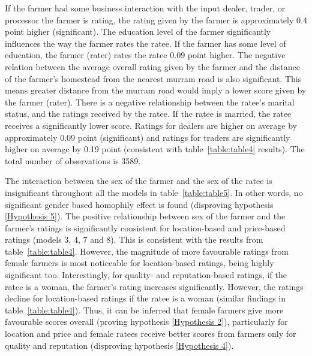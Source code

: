 \documentclass[12pt,english]{article}\usepackage[]{graphicx}\usepackage[]{color}
\begin{document}
\begin{onehalfspace}
If the farmer had some business interaction with the input dealer,
trader, or processor the farmer is rating, the rating given by the
farmer is approximately 0.4
point higher (significant). The education level of the farmer significantly
influences the way the farmer rates the ratee. If the farmer has some
level of education, the farmer (rater) rates the ratee 0.09
point higher. The negative relation between the average overall rating
given by the farmer and the distance of the farmer's homestead from
the nearest murram road is also significant. This means greater distance
from the murram road would imply a lower score given by the farmer
(rater). There is a negative relationship between the ratee's marital
status, and the ratings received by the ratee. If the ratee is married,
the ratee receives a significantly lower score. Ratings for dealers
are higher on average by approximately 0.09
point (significant) and ratings for traders are significantly higher
on average by 0.19
point (consistent with table~\ref{table:table4} results). The total
number of observations is 3589. 
\end{onehalfspace}

The interaction between the sex of the farmer and the sex of the ratee
is insignificant throughout all the models in table~\ref{table:table5}.
In other words, no significant gender based homophily effect is found
(disproving hypothesis \ref{Hypothesis 5}). The positive relationship
between sex of the farmer and the farmer's ratings is significantly
consistent for location-based and price-based ratings (models 3, 4,
7 and 8). This is consistent with the results from table~\ref{table:table4}.
However, the magnitude of more favourable ratings from female farmers
is most noticeable for location-based ratings, being highly significant
too. Interestingly, for quality- and reputation-based ratings, if
the ratee is a woman, the farmer's rating increases significantly.
However, the ratings decline for location-based ratings if the ratee
is a woman (similar findings in table~\ref{table:table4}). Thus,
it can be inferred that female farmers give more favourable scores
overall (proving hypothesis \ref{Hypothesis 2}), particularly for
location and price and female ratees receive better scores from farmers
only for quality and reputation (disproving hypothesis \ref{Hypothesis 4}). 
\end{document}
